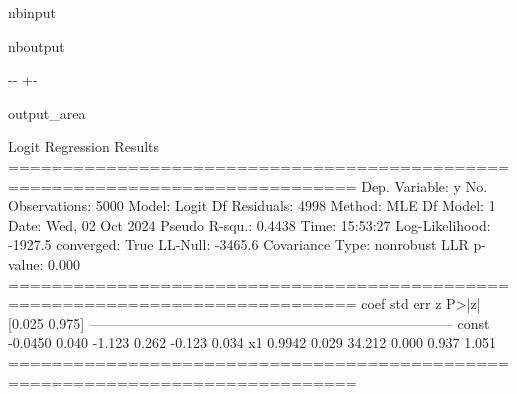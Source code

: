 \documentclass[letterpaper,10pt,english]{sphinxmanual}
\begin{document}
\begin{sphinxuseclass}{nbinput}
{
\begin{sphinxVerbatim}[commandchars=\\\{\}]
\llap{\color{nbsphinxin}[3]:\,\hspace{\fboxrule}\hspace{\fboxsep}}   
  
  \PYG{p}{[}\PYG{p}{]}
\end{sphinxVerbatim}
}

\end{sphinxuseclass}
\begin{sphinxuseclass}{nboutput}
{

\kern-\sphinxverbatimsmallskipamount\kern-\baselineskip
\kern+\FrameHeightAdjust\kern-\fboxrule
\vspace{\nbsphinxcodecellspacing}

\begin{sphinxuseclass}{output_area}
\begin{sphinxuseclass}{}


\begin{sphinxVerbatim}[commandchars=\\\{\}]
                           Logit Regression Results
==============================================================================
Dep. Variable:                      y   No. Observations:                 5000
Model:                          Logit   Df Residuals:                     4998
Method:                           MLE   Df Model:                            1
Date:                Wed, 02 Oct 2024   Pseudo R-squ.:                  0.4438
Time:                        15:53:27   Log-Likelihood:                -1927.5
converged:                       True   LL-Null:                       -3465.6
Covariance Type:            nonrobust   LLR p-value:                     0.000
==============================================================================
                 coef    std err          z      P>|z|      [0.025      0.975]
------------------------------------------------------------------------------
const         -0.0450      0.040     -1.123      0.262      -0.123       0.034
x1             0.9942      0.029     34.212      0.000       0.937       1.051
==============================================================================
\end{sphinxVerbatim}



\end{sphinxuseclass}
\end{sphinxuseclass}
}

\end{sphinxuseclass}
\end{document}
